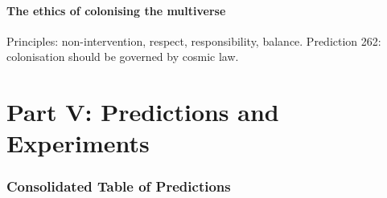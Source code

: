 \documentclass[11pt,a4paper]{article}
\begin{document}
\subsection{The ethics of colonising the multiverse}
Principles: non-intervention, respect, responsibility, balance. Prediction 262: colonisation should be governed by cosmic law.

\newpage
\part*{Part V: Predictions and Experiments}

\section{Consolidated Table of Predictions}
\end{document}
